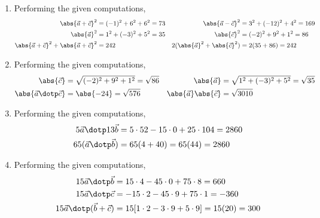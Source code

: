 \begin{enumerate}
    \item Performing the given computations,
          \begin{align}
              \abs{\vec{a} + \vec{c}}^2            & = (-1)^2 + 6^2 + 6^2 = 73   &
              \abs{\vec{a} - \vec{c}}^2            & = 3^2 + (-12)^2 + 4^2 = 169   \\
              \abs{\vec{a}}^2                      & = 1^2 + (-3)^2 + 5^2 = 35   &
              \abs{\vec{c}}^2                      & = (-2)^2 + 9^2 + 1^2 = 86     \\
              \abs{\vec{a} + \vec{c}}^2
              + \abs{\vec{a} + \vec{c}}^2          & = 242                       &
              2(\abs{\vec{a}}^2 + \abs{\vec{c}}^2) & = 2(35 + 86) = 242
          \end{align}

    \item Performing the given computations,
          \begin{align}
              \abs{\vec{c}}               & = \sqrt{(-2)^2 + 9^2 + 1^2}
              = \sqrt{86}                 &
              \abs{\vec{a}}               & = \sqrt{1^2 + (-3)^2 + 5^2}
              = \sqrt{35}                                                 \\
              \abs{\vec{a}
              \dotp \vec{c}}              & = \abs{-24} = \sqrt{576}    &
              \abs{\vec{a}} \abs{\vec{c}} & = \sqrt{3010}
          \end{align}

    \item Performing the given computations,
          \begin{align}
              5\vec{a} \dotp 13\vec{b}   & = 5 \cdot 52 - 15 \cdot 0 + 25 \cdot 104
              = 2860                                                                \\
              65 (\vec{a} \dotp \vec{b}) & = 65 (4 + 40) = 65(44) = 2860
          \end{align}

    \item Performing the given computations,
          \begin{align}
              15\vec{a} \dotp \vec{b} & = 15 \cdot 4 - 45 \cdot 0 + 75 \cdot 8
              = 660                                                              \\
              15\vec{a} \dotp \vec{c} & = -15 \cdot 2 - 45 \cdot 9 + 75 \cdot 1
              = -360                                                             \\
              15 \vec{a} \dotp
              (\vec{b} + \vec{c})     & = 15 [1 \cdot 2 - 3 \cdot 9 + 5 \cdot 9]
              = 15 (20) = 300
          \end{align}


\end{enumerate}
